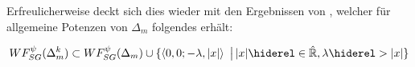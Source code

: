 Erfreulicherweise deckt sich dies wieder mit den Ergebnissen von \textcite[Cor. 3.70]{Schulz2014}, welcher für allgemeine Potenzen von $\Delta_m$ folgendes erhält:

\begin{equation*}
    WF_{SG}^\psi (\Delta_m^k) \subset
    WF_{SG}^\psi(\Delta_m) \cup
    \{\left\langle0,0;-\lambda, |x|\right\rangle\ \big| \, |x| \hiderel\in \hat{\mathbb{R}}, \lambda \hiderel > |x|\}
\end{equation*}









